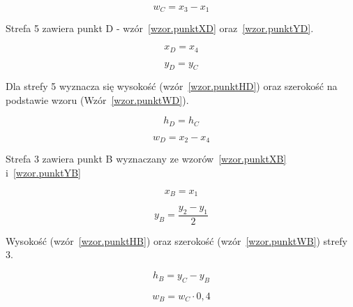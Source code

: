 \documentclass[a4paper,twoside,12pt]{book}
\begin{document}
    \large
    \begin{equation}
        w_{C}= x_{3} - x_{1}
        \label{wzor.punktWC}
    \end{equation}
    \normalsize

    Strefa 5 zawiera punkt D - wzór~\ref{wzor.punktXD} oraz~\ref{wzor.punktYD}.

    \large
    \begin{equation}
        x_{D}=x_{4}
        \label{wzor.punktXD}
    \end{equation}
    \normalsize

    \large
    \begin{equation}
        y_{D}= y_{C}
        \label{wzor.punktYD}
    \end{equation}
    \normalsize

    Dla strefy 5 wyznacza się wysokość (wzór~\ref{wzor.punktHD}) oraz
    szerokość na podstawie wzoru (Wzór~\ref{wzor.punktWD}).

    \large
    \begin{equation}
        h_{D}=h_{C}
        \label{wzor.punktHD}
    \end{equation}
    \normalsize

    \large
    \begin{equation}
        w_{D}= x_{2} - x_{4}
        \label{wzor.punktWD}
    \end{equation}
    \normalsize

    Strefa 3 zawiera punkt B wyznaczany ze wzorów~\ref{wzor.punktXB} i~\ref{wzor.punktYB}

    \large
    \begin{equation}
        x_{B}=x_{1}
        \label{wzor.punktXB}
    \end{equation}
    \normalsize

    \large
    \begin{equation}
        y_{B}= \frac{y_{2} - y_{1}}{2}
        \label{wzor.punktYB}
    \end{equation}
    \normalsize

    Wysokość (wzór~\ref{wzor.punktHB}) oraz szerokość (wzór~\ref{wzor.punktWB}) strefy 3.

    \large
    \begin{equation}
        h_{B}=y_{C} - y_{B}
        \label{wzor.punktHB}
    \end{equation}
    \normalsize

    \large
    \begin{equation}
        w_{B}= w_{C}\cdot0,4
        \label{wzor.punktWB}
    \end{equation}
    \normalsize
\end{document}
